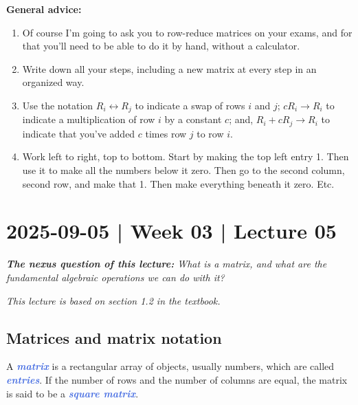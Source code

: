 \documentclass[10pt]{article}
\newcommand{\demph}[1]{\textcolor{RoyalBlue}{\textbf{\slshape #1}}} %
\theoremstyle{definition}
\newcommand{\fl}[1]{\noindent\textbf{#1}}            %
\begin{document}
\fl{General advice:}
\begin{enumerate}
  \item Of course I'm going to ask you to row-reduce matrices on your exams,
  and for that you'll need to be able to do it by hand, without a calculator.
  \item Write down all your steps, including a new matrix at every step in an
  organized way.
  \item Use the notation $R_{i}\leftrightarrow R_{j}$ to indicate a swap of
  rows $i$ and $j$; $cR_{i}\to R_{i}$ to indicate a multiplication of row $i$
  by a constant $c$; and, $R_{i}+cR_{j}\to R_{i}$ to indicate that you've
  added $c$ times row $j$ to row $i$.
  \item Work left to right, top to bottom. Start by making the top left entry
  1. Then use it to make all the numbers below it zero. Then go to the second
  column, second row, and make that 1. Then make everything beneath it zero.
  Etc.
\end{enumerate}

\newpage
\section{2025-09-05 | Week 03 | Lecture 05}

\begin{center}
  \begin{tcolorbox}[width=0.9\textwidth, colback=white, colframe=black]
    \textit{\textbf{The nexus question of this lecture:} What is a matrix, and
      what are the fundamental algebraic operations we can do with it?}
  \end{tcolorbox}
\end{center}

\textit{This lecture is based on section 1.2 in the textbook.}

\subsection{Matrices and matrix notation}

A \demph{matrix} is a rectangular array of objects, usually numbers, which are
called \demph{entries}. If the number of rows and the number of columns are
equal, the matrix is said to be a \demph{square matrix}.
\end{document}

